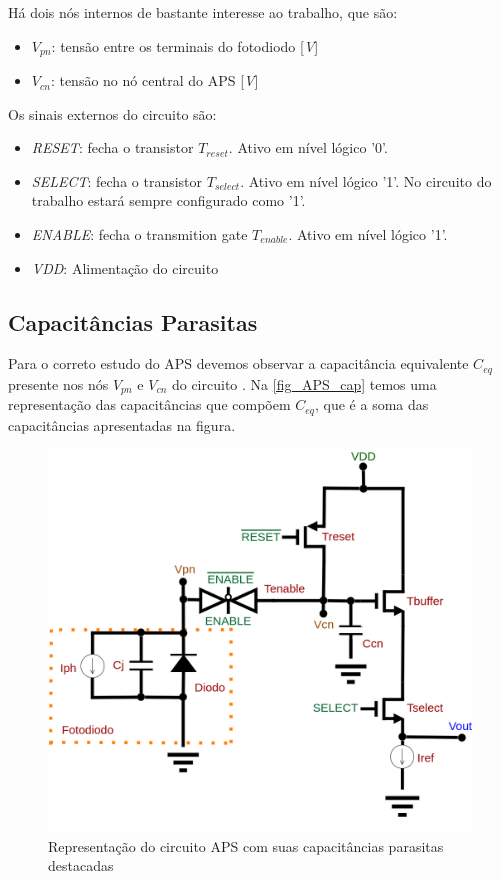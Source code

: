     H\'a dois n\'os internos de bastante interesse ao trabalho, que são:

\begin{itemize}
    \item \textit{$V_{pn}$}: tensão entre os terminais do fotodiodo [\textit{V}]
    \item \textit{$V_{cn}$}: tensão no n\'o central do APS [\textit{V}]
\end{itemize}

    Os sinais externos do circuito são:
    
\begin{itemize}
    \item \textit{RESET}: fecha o transistor $T_{reset}$. Ativo em n\'ivel l\'ogico '0'.
     \item \textit{SELECT}: fecha o transistor $T_{select}$. Ativo em n\'ivel l\'ogico '1'. No circuito do trabalho estar\'a sempre configurado como '1'.
     \item \textit{ENABLE}: fecha o transmition gate $T_{enable}$. Ativo em n\'ivel l\'ogico '1'.
     \item \textit{VDD}: Alimentação do circuito
\end{itemize}

\subsection{Capacit\^ancias Parasitas}
Para o correto estudo do APS devemos observar a capacit\^ancia equivalente $C_{eq}$ presente nos n\'os $V_{pn}$ e $V_{cn}$ do circuito \cite{LidianeCampos}. Na \autoref{fig_APS_cap} temos uma representação das capacit\^ancias que compõem $C_{eq}$, que é a soma das capacitâncias apresentadas na figura.

\begin{figure}[!h]
	\caption{\label{fig_APS_cap}Representação do circuito APS com suas capacit\^ancias parasitas destacadas}
	\begin{center}
	    \includegraphics[scale=0.3]{Circuitos/APS_cap.png}
	\end{center}
\end{figure}

